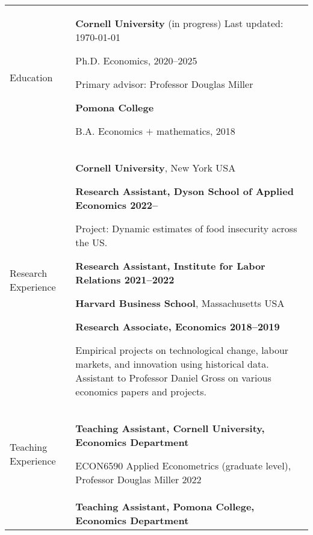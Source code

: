 \documentclass[letterpaper,11pt,oneside]{article}
\begin{document}
\noindent
\begin{tabular}[\textwidth]{p{} p{}}
    \Large{Education}
    & \textbf{Cornell University} (in progress)  \hfill Last updated: \today

    Ph.D. Economics, 2020--2025 
    
    Primary advisor: Professor Douglas Miller \vspace{0.1cm}
    
    \textbf{Pomona College}

    B.A. Economics $+$ mathematics, 2018 \vspace{0.2cm} \\
    
    
    
\Large{Research Experience}
    & \textbf{Cornell University}, New York USA
    
    \textbf{Research Assistant, Dyson School of Applied Economics \hfill 2022--}

    Project: Dynamic estimates of food insecurity across the US.
    
    \textbf{Research Assistant, Institute for Labor Relations \hfill 2021--2022}
    \vspace{0.2cm}

    \textbf{Harvard Business School}, Massachusetts USA
    
    \textbf{Research Associate, Economics \hfill 2018--2019}
    
    Empirical projects on technological change, labour markets, and innovation using historical data.
    Assistant to Professor Daniel Gross on various economics papers and projects.
    \vspace{0.2cm} \\

\Large{Teaching Experience}
    & \textbf{Teaching Assistant, Cornell University, Economics Department}
    
    ECON6590 Applied Econometrics (graduate level), Professor Douglas Miller \hfill 2022 \\

    & \textbf{Teaching Assistant, Pomona College, Economics Department}
    

\end{tabular}
\end{document}
